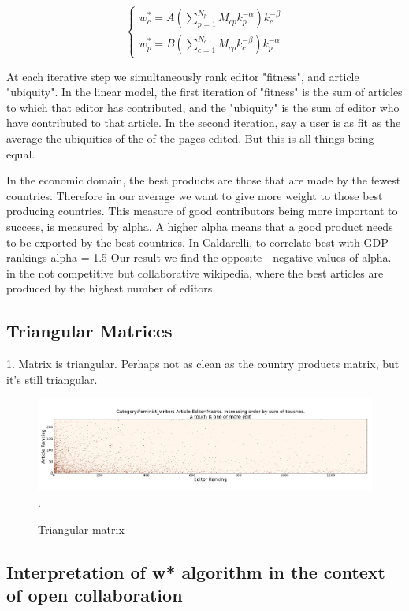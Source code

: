 \documentclass{acm_proc_article-sp}
\begin{document}
\begin{equation}
\begin{cases}
 w^*_c = A(\sum^{N_p}_{p=1} M_{cp}k_p^{-\alpha})k_c^{-\beta} \\
w^*_p = B(\sum^{N_c}_{c=1} M_{cp}k_c^{-\beta})k_p^{-\alpha}
\end{cases}
\end{equation}

At each iterative step we simultaneously rank editor "fitness", and article "ubiquity". In the linear model, the first iteration of "fitness" is the sum of articles to which that editor has contributed, and the "ubiquity" is the sum of editor who have contributed to that article. In the second iteration, say a user is as fit as the average the ubiquities of the of the pages edited. But this is all things being equal.

In the economic domain, the best products are those that are made by the fewest countries. Therefore in our average we want to give more weight to those best producing countries. This measure of good contributors being more important to success, is measured by alpha. A higher alpha means that a good product needs to be exported by the best countries. In Caldarelli, to correlate best with GDP rankings alpha = 1.5 Our result we find the  opposite - negative values of alpha. in the not competitive but collaborative wikipedia, where the best articles are produced by the highest number of editors

\subsection{Triangular Matrices}
1. Matrix is triangular.
Perhaps not as clean as the country products matrix, but it's still triangular.

\begin{figure}[!t]
\centering
\includegraphics[width=0.9\columnwidth]{Category:Feminist_writerstriangle_matrix_corrected.png}.
\caption{Triangular matrix}
\label{fig:triangle_matrix}
\end{figure}

\subsection{Interpretation of w* algorithm in the context of open collaboration}
\end{document}
